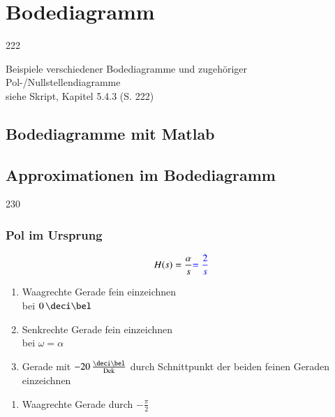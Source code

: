 \section{Bodediagramm}{222}

Beispiele verschiedener Bodediagramme und zugehöriger Pol-/Nullstellendiagramme \\
siehe Skript, Kapitel 5.4.3 (S. 222)


\subsection{Bodediagramme mit Matlab}




\subsection{Approximationen im Bodediagramm}{230}

\subsubsection{Pol im Ursprung}

\begin{minipage}[t]{0.48\columnwidth}
    $$ H(s) = \frac{\alpha}{s} {\color{blue}= \frac{2}{s}} $$
    
\end{minipage}
\hfill
\begin{minipage}[t]{0.48\columnwidth}

    \begin{enumerate}
        \item Waagrechte Gerade fein einzeichnen\\bei $0 \, \deci \bel$
        \item Senkrechte Gerade fein einzeichnen\\bei $\omega = \alpha$
        \item Gerade mit $-20 \, \frac{\deci \bel}{\Dek}$ durch Schnittpunkt der beiden feinen Geraden einzeichnen
    \end{enumerate}
    

    \begin{enumerate}
        \item Waagrechte Gerade durch $-\frac{\pi}{2}$
    \end{enumerate}
\end{minipage}


